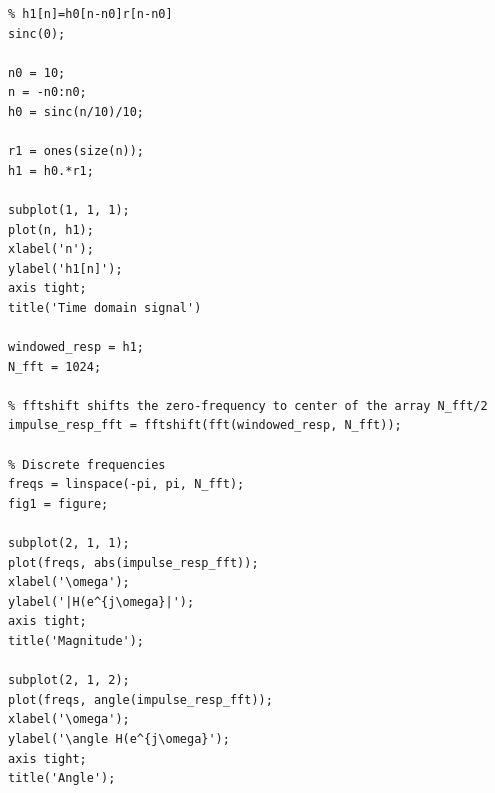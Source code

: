 \documentclass[12pt]{article}
\begin{document}
\begin{enumerate}[label=\textbf{\alph*)}, leftmargin=2.6em]
\begin{verbatim}
% h1[n]=h0[n-n0]r[n-n0]
sinc(0);

n0 = 10;
n = -n0:n0;
h0 = sinc(n/10)/10;

r1 = ones(size(n));
h1 = h0.*r1;

subplot(1, 1, 1);
plot(n, h1);
xlabel('n');
ylabel('h1[n]');
axis tight;
title('Time domain signal')

windowed_resp = h1;
N_fft = 1024;

% fftshift shifts the zero-frequency to center of the array N_fft/2
impulse_resp_fft = fftshift(fft(windowed_resp, N_fft));

% Discrete frequencies
freqs = linspace(-pi, pi, N_fft);
fig1 = figure;

subplot(2, 1, 1);
plot(freqs, abs(impulse_resp_fft));
xlabel('\omega');
ylabel('|H(e^{j\omega}|');
axis tight;
title('Magnitude');

subplot(2, 1, 2);
plot(freqs, angle(impulse_resp_fft));
xlabel('\omega');
ylabel('\angle H(e^{j\omega}');
axis tight;
title('Angle');
\end{verbatim}


\end{enumerate}
\end{document}
